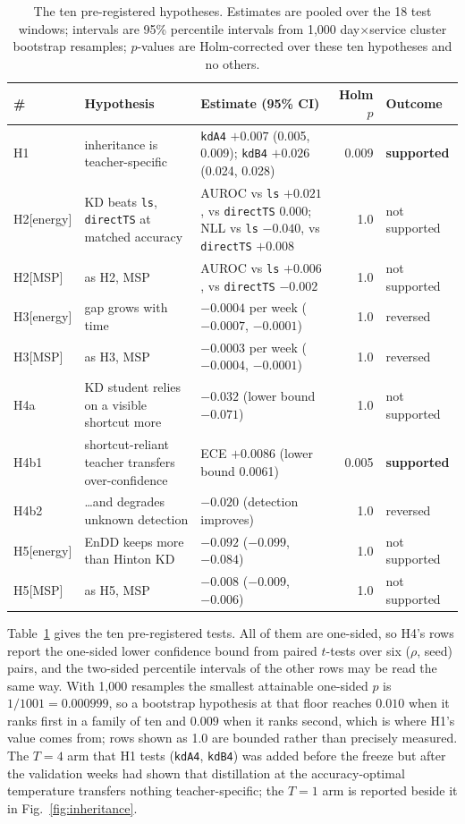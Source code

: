 \documentclass[journal]{IEEEtran}
\newcommand{\kd}[1]{\texttt{#1}}
\begin{document}
\begin{table}[t]
\centering
\caption{The ten pre-registered hypotheses. Estimates are pooled over the 18 test windows; intervals are 95\% percentile intervals from 1,000 day$\times$service cluster bootstrap resamples; $p$-values are Holm-corrected over these ten hypotheses and no others.}
\label{tab:hypotheses}
\footnotesize
\begin{tabular}{@{}l l p{70mm} r l@{}}
\toprule
\# & Hypothesis & Estimate (95\% CI) & Holm $p$ & Outcome \\
\midrule
H1 & inheritance is teacher-specific & \kd{kdA4} $+0.007$ (0.005, 0.009); \kd{kdB4} $+0.026$ (0.024, 0.028) & 0.009 & \textbf{supported} \\
H2[energy] & KD beats \kd{ls}, \kd{directTS} at matched accuracy & AUROC vs \kd{ls} $+0.021$, vs \kd{directTS} $0.000$; NLL vs \kd{ls} $-0.040$, vs \kd{directTS} $+0.008$ & 1.0 & not supported \\
H2[MSP] & as H2, MSP & AUROC vs \kd{ls} $+0.006$, vs \kd{directTS} $-0.002$ & 1.0 & not supported \\
H3[energy] & gap grows with time & $-0.0004$ per week ($-0.0007$, $-0.0001$) & 1.0 & reversed \\
H3[MSP] & as H3, MSP & $-0.0003$ per week ($-0.0004$, $-0.0001$) & 1.0 & reversed \\
H4a & KD student relies on a visible shortcut more & $-0.032$ (lower bound $-0.071$) & 1.0 & not supported \\
H4b1 & shortcut-reliant teacher transfers over-confidence & ECE $+0.0086$ (lower bound 0.0061) & 0.005 & \textbf{supported} \\
H4b2 & \ldots and degrades unknown detection & $-0.020$ (detection improves) & 1.0 & reversed \\
H5[energy] & EnDD keeps more than Hinton KD & $-0.092$ ($-0.099$, $-0.084$) & 1.0 & not supported \\
H5[MSP] & as H5, MSP & $-0.008$ ($-0.009$, $-0.006$) & 1.0 & not supported \\
\bottomrule
\end{tabular}
\end{table}

Table~\ref{tab:hypotheses} gives the ten pre-registered tests. All of them are one-sided, so H4's rows report the one-sided lower confidence bound from paired $t$-tests over six ($\rho$, seed) pairs, and the two-sided percentile intervals of the other rows may be read the same way. With 1,000 resamples the smallest attainable one-sided $p$ is $1/1001 = 0.000999$, so a bootstrap hypothesis at that floor reaches $0.010$ when it ranks first in a family of ten and $0.009$ when it ranks second, which is where H1's value comes from; rows shown as 1.0 are bounded rather than precisely measured. The $T=4$ arm that H1 tests (\kd{kdA4}, \kd{kdB4}) was added before the freeze but after the validation weeks had shown that distillation at the accuracy-optimal temperature transfers nothing teacher-specific; the $T=1$ arm is reported beside it in Fig.~\ref{fig:inheritance}.
\end{document}
